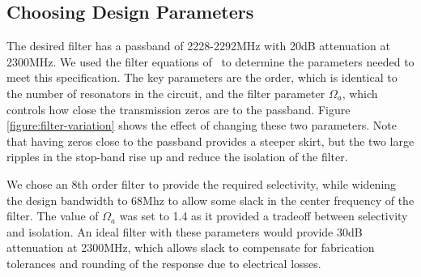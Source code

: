 \subsection{Choosing Design Parameters}
The desired filter has a passband of 2228-2292MHz with 20dB attenuation at 2300MHz. We used the filter equations of~\cite{hong:microstrip} to determine the parameters needed to meet this specification. The key parameters are the order, which is identical to the number of resonators in the circuit, and the filter parameter $\Omega_a$, which controls how close the transmission zeros are to the passband. Figure \ref{figure:filter-variation} shows the effect of changing these two parameters. Note that having zeros close to the passband provides a steeper skirt, but the two large ripples in the stop-band rise up and reduce the isolation of the filter.

We chose an 8th order filter to provide the required selectivity, while widening the design bandwidth to 68Mhz to allow some slack in the center frequency of the filter. The value of $\Omega_a$ was set to 1.4 as it provided a tradeoff between selectivity and isolation. An ideal filter with these parameters would provide 30dB attenuation at 2300MHz, which allows slack to compensate for fabrication tolerances and rounding of the response due to electrical losses.

